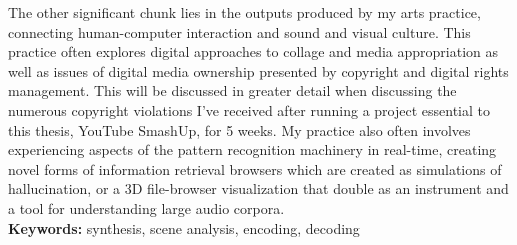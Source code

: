 \documentclass[a4paper,11pt,twoside]{ThesisStyle}
\begin{document}
The other significant chunk lies in the outputs produced by my arts practice, connecting human-computer interaction and sound and visual culture.  This practice often explores digital approaches to collage and media appropriation as well as issues of digital media ownership presented by copyright and digital rights management.  This will be discussed in greater detail when discussing the numerous copyright violations I've received after running a project essential to this thesis, YouTube SmashUp, for 5 weeks.  My practice also often involves experiencing aspects of the pattern recognition machinery in real-time, creating novel forms of information retrieval browsers which are created as simulations of hallucination, or a 3D file-browser visualization that double as an instrument and a tool for understanding large audio corpora.  
\\
{\large\textbf{Keywords:}}
synthesis, scene analysis, encoding, decoding







\appendix



\end{document}
